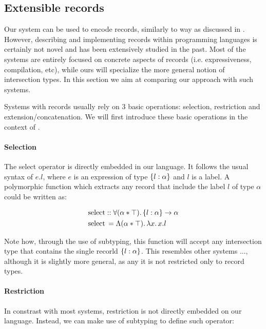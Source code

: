 \subsection{Extensible records}
Our system can be used to encode records, similarly to way as discussed in 
\cite{dunfield2014elaborating}. 
However, describing and implementing records within programming languages is certainly not novel 
and has been extensively studied in the past.
Most of the systems are entirely focused on concrete aspects of records 
(i.e. expressiveness, compilation, etc), while ours will specialize the more general notion of  
intersection types.
In this section we aim at comparing our approach with such systems. 

Systems with records usually rely on 3 basic operations: selection, restriction and 
extension/concatenation. 
We will first introduce these basic operations in the context of \name.

\paragraph{Selection}

The select operator is directly embedded in our language. 
It follows the usual syntax of $e.l$, where $e$ is an expression of type $\{ l : \alpha \}$ and 
$l$ is a label.
A polymorphic function which extracts any record that include the label $l$ of type
$\alpha$ could be written as:

\begin{align*}
&\text{select} :: \forall (\alpha * \top).\, \{ l : \alpha \} \rightarrow \alpha \\
&\text{select} \, = \Lambda (\alpha * \top).\, \lambda x.\, x.l
\end{align*}

Note how, through the use of subtyping, this function will accept any intersection type that contains
the single recorld $\{ l : \alpha \}$.
This resembles other systems ..., although it is slightly more general, as any it is not 
restricted only to record types. 

\paragraph{Restriction}

In constrast with most systems, restriction is not directly embedded on our language.
Instead, we can make use of subtyping to define such operator: 


